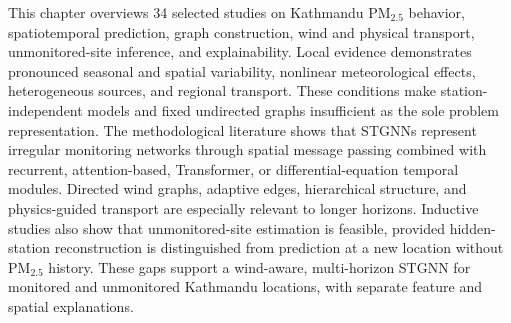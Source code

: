 This chapter overviews 34 selected studies on Kathmandu PM$_{2.5}$ behavior, spatiotemporal prediction, graph construction, wind and physical transport, unmonitored-site inference, and explainability. Local evidence demonstrates pronounced seasonal and spatial variability, nonlinear meteorological effects, heterogeneous sources, and regional transport. These conditions make station-independent models and fixed undirected graphs insufficient as the sole problem representation. The methodological literature shows that STGNNs represent irregular monitoring networks through spatial message passing combined with recurrent, attention-based, Transformer, or differential-equation temporal modules. Directed wind graphs, adaptive edges, hierarchical structure, and physics-guided transport are especially relevant to longer horizons. Inductive studies also show that unmonitored-site estimation is feasible, provided hidden-station reconstruction is distinguished from prediction at a new location without PM$_{2.5}$ history. These gaps support a wind-aware, multi-horizon STGNN for monitored and unmonitored Kathmandu locations, with separate feature and spatial explanations.
